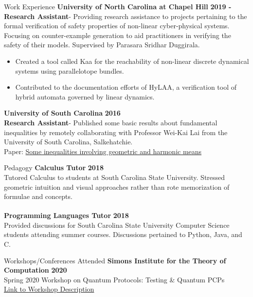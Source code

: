 \documentclass{resume} %
\begin{document}
\begin{rSection}{Work Experience}
{\bf University of North Carolina at Chapel Hill} \hfill {\bf 2019 -} \\
{\bf Research Assistant}- Providing research assistance to projects pertaining to the formal verification of safety properties of non-linear cyber-physical systems. Focusing on counter-example generation to aid practitioners in verifying the safety of their models. Supervised by Parasara Sridhar Duggirala.
\begin{itemize}
\item Created a tool called Kaa for the reachability of non-linear discrete dynamical systems using parallelotope bundles.
\item Contributed to the documentation efforts of HyLAA, a verification tool of hybrid automata governed by linear dynamics.
\end{itemize}

{\bf University of South Carolina} \hfill {\bf 2016} \\
{\bf Research Assistant}- Published some basic results about fundamental inequalities by remotely collaborating with Professor Wei-Kai Lai from the University of South Carolina, Salkehatchie. \\
Paper: \href{http://www.m-hikari.com/imf/imf-2016/1-4-2016/51190.html}{Some inequalities involving geometric and harmonic means}
\end{rSection}

\begin{rSection}{Pedagogy}
{\bf Calculus Tutor} \hfill {\bf 2018} \\
Tutored Calculus to students at South Carolina State University. Stressed geometric intuition and visual approaches rather than rote memorization of formulae and concepts. \\
\\
{\bf Programming Languages Tutor} \hfill {\bf 2018} \\
Provided discussions for South Carolina State University Computer Science students attending summer courses. Discussions pertained to Python, Java, and C. \\
\end{rSection}


\begin{rSection}{Workshops/Conferences Attended}
{\bf Simons Institute for the Theory of Computation} \hfill {\bf 2020} \\
Spring 2020 Workshop on Quantum Protocols: Testing \& Quantum PCPs \\
\href{https://simons.berkeley.edu/workshops/quantum-2020-2}{Link to Workshop Description}
\end{rSection}
\end{document}
